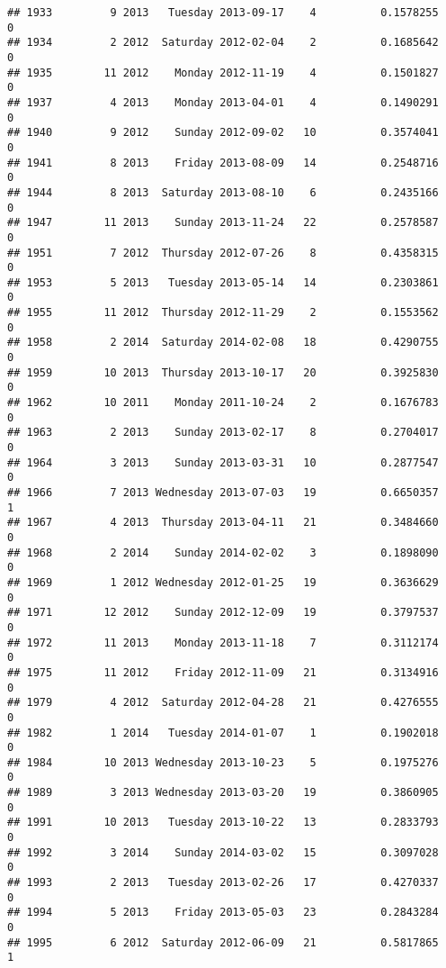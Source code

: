 \documentclass[
]{article}
\begin{document}
\begin{verbatim}
## 1933         9 2013   Tuesday 2013-09-17    4          0.1578255             0
## 1934         2 2012  Saturday 2012-02-04    2          0.1685642             0
## 1935        11 2012    Monday 2012-11-19    4          0.1501827             0
## 1937         4 2013    Monday 2013-04-01    4          0.1490291             0
## 1940         9 2012    Sunday 2012-09-02   10          0.3574041             0
## 1941         8 2013    Friday 2013-08-09   14          0.2548716             0
## 1944         8 2013  Saturday 2013-08-10    6          0.2435166             0
## 1947        11 2013    Sunday 2013-11-24   22          0.2578587             0
## 1951         7 2012  Thursday 2012-07-26    8          0.4358315             0
## 1953         5 2013   Tuesday 2013-05-14   14          0.2303861             0
## 1955        11 2012  Thursday 2012-11-29    2          0.1553562             0
## 1958         2 2014  Saturday 2014-02-08   18          0.4290755             0
## 1959        10 2013  Thursday 2013-10-17   20          0.3925830             0
## 1962        10 2011    Monday 2011-10-24    2          0.1676783             0
## 1963         2 2013    Sunday 2013-02-17    8          0.2704017             0
## 1964         3 2013    Sunday 2013-03-31   10          0.2877547             0
## 1966         7 2013 Wednesday 2013-07-03   19          0.6650357             1
## 1967         4 2013  Thursday 2013-04-11   21          0.3484660             0
## 1968         2 2014    Sunday 2014-02-02    3          0.1898090             0
## 1969         1 2012 Wednesday 2012-01-25   19          0.3636629             0
## 1971        12 2012    Sunday 2012-12-09   19          0.3797537             0
## 1972        11 2013    Monday 2013-11-18    7          0.3112174             0
## 1975        11 2012    Friday 2012-11-09   21          0.3134916             0
## 1979         4 2012  Saturday 2012-04-28   21          0.4276555             0
## 1982         1 2014   Tuesday 2014-01-07    1          0.1902018             0
## 1984        10 2013 Wednesday 2013-10-23    5          0.1975276             0
## 1989         3 2013 Wednesday 2013-03-20   19          0.3860905             0
## 1991        10 2013   Tuesday 2013-10-22   13          0.2833793             0
## 1992         3 2014    Sunday 2014-03-02   15          0.3097028             0
## 1993         2 2013   Tuesday 2013-02-26   17          0.4270337             0
## 1994         5 2013    Friday 2013-05-03   23          0.2843284             0
## 1995         6 2012  Saturday 2012-06-09   21          0.5817865             1

\end{verbatim}
\end{document}
